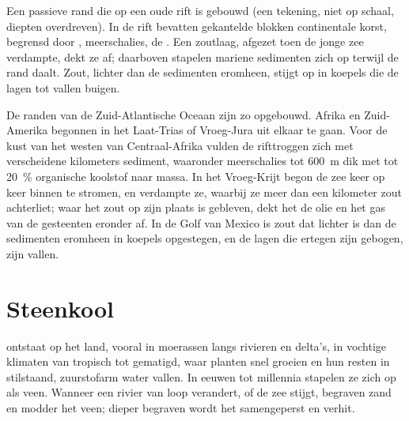 \begin{omfigure}

{\small Een passieve rand die op een oude rift is gebouwd (een tekening, niet op schaal, diepten
overdreven). In de rift bevatten gekantelde blokken continentale korst, begrensd door
, meerschalies, de . Een zoutlaag, afgezet
toen de jonge zee verdampte, dekt ze af; daarboven stapelen mariene sedimenten zich
op terwijl de rand daalt. Zout, lichter dan de sedimenten eromheen, stijgt op
in koepels die de lagen tot vallen buigen.}
\end{omfigure}

De randen van de Zuid-Atlantische Oceaan zijn zo opgebouwd. Afrika en Zuid-Amerika
begonnen in het Laat-Trias of Vroeg-Jura uit elkaar te gaan. Voor de kust van
het westen van Centraal-Afrika vulden de rifttroggen zich met verscheidene kilometers
sediment, waaronder meerschalies tot \qty{600}{m} dik met tot
\qty{20}{\percent} organische koolstof naar massa. In het Vroeg-Krijt begon de zee
keer op keer binnen te stromen, en verdampte ze, waarbij ze meer dan een
kilometer zout achterliet; waar het zout op zijn plaats is gebleven, dekt het de olie en het
gas van de gesteenten eronder af. In de Golf van Mexico is zout dat lichter is dan de
sedimenten eromheen in koepels opgestegen, en de lagen die ertegen zijn gebogen,
zijn vallen.

\section{Steenkool}

 ontstaat op het land, vooral in moerassen langs rivieren en delta's, in vochtige
klimaten van tropisch tot gematigd, waar planten snel groeien en hun resten
in stilstaand, zuurstofarm water vallen. In eeuwen tot millennia stapelen ze zich
op als veen. Wanneer een rivier van loop verandert, of de zee stijgt, begraven zand en modder
het veen; dieper begraven wordt het samengeperst en verhit.

